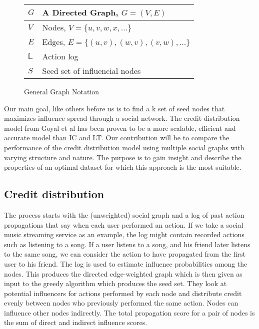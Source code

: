 \documentclass{acm_proc_article-sp}
\begin{document}
\begin{figure}
	\centering
	\begin{tabulary}{\linewidth}{|l|L|}
			\hline
			$G$ & A Directed Graph, $G = (V,E)$ \\\hline
			$V$ & Nodes, $V = \{u,v,w,x,...\}$ \\\hline
			$E$ & Edges, $E = \{(u, v),(w, v),(v,w),...\}$ \\\hline
			$\mathbb{L}$ & Action log \\\hline
			$S$ & Seed set of influencial nodes \\\hline

	\end{tabulary}
	\caption{General Graph Notation}
	\label{general-notation}
\end{figure}

Our main goal, like others before us is to find a k set of seed nodes that maximizes influence spread through a social network. The credit distribution model from Goyal et al has been proven to be a more scalable, efficient and accurate model than IC and LT. Our contribution will be to compare the performance of the credit distribution model using multiple social graphs with varying structure and nature. The purpose is to gain insight and describe the properties of an optimal dataset for which this approach is the most suitable.

\subsection{Credit distribution}

The process starts with the (unweighted) social graph and a log of past action propagations that say when each user performed an action. If we take a social music streaming service as an example, the log might contain recorded actions such as listening to a song. If a user listens to a song, and his friend later listens to the same song, we can consider the action to have propagated from the first user to his friend. The log is used to estimate influence probabilities among the nodes. This produces the directed edge-weighted graph which is then given as input to the greedy algorithm which produces the seed set. They look at potential influencers for actions performed by each node and distribute credit evenly between nodes who previously performed the same action. Nodes can influence other nodes indirectly. The total propagation score for a pair of nodes is the sum of direct and indirect influence scores.
\end{document}
